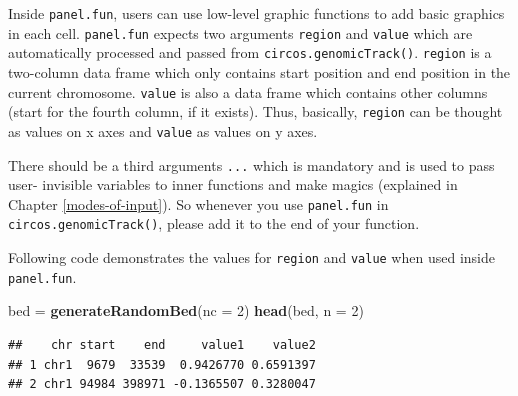 \documentclass[]{book}
\newenvironment{Shaded}{\begin{snugshade}}{\end{snugshade}}
\newcommand{\KeywordTok}[1]{\textcolor[rgb]{0.13,0.29,0.53}{\textbf{#1}}}
\newcommand{\DataTypeTok}[1]{\textcolor[rgb]{0.13,0.29,0.53}{#1}}
\newcommand{\DecValTok}[1]{\textcolor[rgb]{0.00,0.00,0.81}{#1}}
\newcommand{\StringTok}[1]{\textcolor[rgb]{0.31,0.60,0.02}{#1}}
\newcommand{\OtherTok}[1]{\textcolor[rgb]{0.56,0.35,0.01}{#1}}
\newcommand{\ControlFlowTok}[1]{\textcolor[rgb]{0.13,0.29,0.53}{\textbf{#1}}}
\newcommand{\OperatorTok}[1]{\textcolor[rgb]{0.81,0.36,0.00}{\textbf{#1}}}
\newcommand{\NormalTok}[1]{#1}
\theoremstyle{definition}
\theoremstyle{definition}
\theoremstyle{remark}
\begin{document}
Inside \texttt{panel.fun}, users can use low-level graphic functions to
add basic graphics in each cell. \texttt{panel.fun} expects two
arguments \texttt{region} and \texttt{value} which are automatically
processed and passed from \texttt{circos.genomicTrack()}.
\texttt{region} is a two-column data frame which only contains start
position and end position in the current chromosome. \texttt{value} is
also a data frame which contains other columns (start for the fourth
column, if it exists). Thus, basically, \texttt{region} can be thought
as values on x axes and \texttt{value} as values on y axes.

There should be a third arguments \texttt{...} which is mandatory and is
used to pass user- invisible variables to inner functions and make
magics (explained in Chapter \ref{modes-of-input}). So whenever you use
\texttt{panel.fun} in \texttt{circos.genomicTrack()}, please add it to
the end of your function.

Following code demonstrates the values for \texttt{region} and
\texttt{value} when used inside \texttt{panel.fun}.

\begin{Shaded}
\begin{Highlighting}[]
\NormalTok{bed =}\StringTok{ }\KeywordTok{generateRandomBed}\NormalTok{(}\DataTypeTok{nc =} \DecValTok{2}\NormalTok{)}
\KeywordTok{head}\NormalTok{(bed, }\DataTypeTok{n =} \DecValTok{2}\NormalTok{)}
\end{Highlighting}
\end{Shaded}

\begin{verbatim}
##    chr start    end     value1    value2
## 1 chr1  9679  33539  0.9426770 0.6591397
## 2 chr1 94984 398971 -0.1365507 0.3280047
\end{verbatim}

\begin{Shaded}
\end{Shaded}
\end{document}
